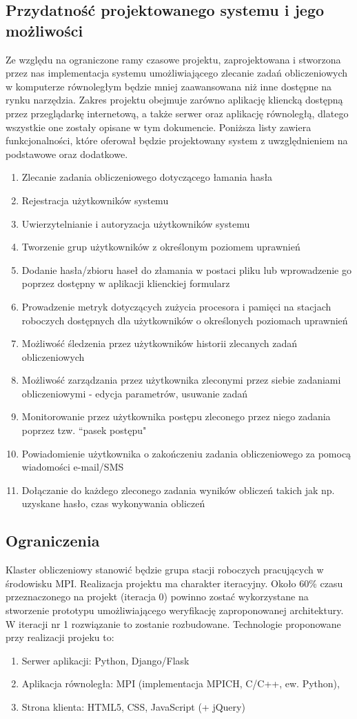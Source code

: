 \documentclass[a4paper,10pt]{article}
\begin{document}
\subsection{Przydatność projektowanego systemu i jego możliwości}
Ze względu na ograniczone ramy czasowe projektu, zaprojektowana i stworzona przez nas implementacja systemu umożliwiającego zlecanie zadań obliczeniowych w komputerze równoległym będzie mniej zaawansowana niż inne dostępne na rynku narzędzia. Zakres projektu obejmuje zarówno aplikację kliencką dostępną przez przeglądarkę internetową, a także serwer oraz aplikację równoległą, dlatego wszystkie one zostały opisane w tym dokumencie. Poniższa listy zawiera funkcjonalności, które oferował będzie projektowany system z uwzględnieniem na podstawowe oraz dodatkowe.
\begin{enumerate}
\item Zlecanie zadania obliczeniowego dotyczącego łamania hasła
\item Rejestracja użytkowników systemu
\item Uwierzytelnianie i autoryzacja użytkowników systemu
\item Tworzenie grup użytkowników z określonym poziomem uprawnień
\item Dodanie hasła/zbioru haseł do złamania w postaci pliku lub wprowadzenie go poprzez dostępny w aplikacji klienckiej formularz
\item Prowadzenie metryk dotyczących zużycia procesora i pamięci na stacjach roboczych dostępnych dla użytkowników o określonych poziomach uprawnień
\item Możliwość śledzenia przez użytkowników historii zlecanych zadań obliczeniowych
\item Możliwość zarządzania przez użytkownika zleconymi przez siebie zadaniami obliczeniowymi - edycja parametrów, usuwanie zadań
\item Monitorowanie przez użytkownika postępu zleconego przez niego zadania poprzez tzw. ``pasek postępu"
\item Powiadomienie użytkownika o zakończeniu zadania obliczeniowego za pomocą wiadomości e-mail/SMS
\item Dołączanie do każdego zleconego zadania wyników obliczeń takich jak np. uzyskane hasło, czas wykonywania obliczeń
\end{enumerate}
\subsection{Ograniczenia}
Klaster obliczeniowy stanowić będzie grupa stacji roboczych pracujących w środowisku MPI. Realizacja projektu ma charakter iteracyjny. Około 60\% czasu przeznaczonego na projekt (iteracja 0) powinno zostać wykorzystane na stworzenie prototypu umożliwiającego weryfikację zaproponowanej architektury. W iteracji nr 1 rozwiązanie to zostanie rozbudowane. Technologie proponowane przy realizacji projeku to:
\begin{enumerate}
\item Serwer aplikacji: Python, Django/Flask
\item Aplikacja równoległa: MPI (implementacja MPICH, C/C++, ew. Python),
\item Strona klienta: HTML5, CSS, JavaScript (+ jQuery)
\end{enumerate}
\end{document}
